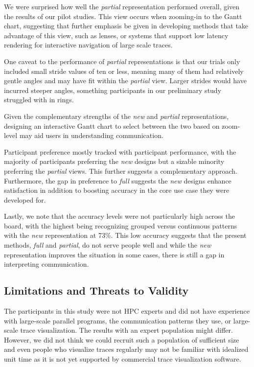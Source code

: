We were surprised how well the  {\em partial} representation performed overall, given the results of our pilot studies. This view occurs when zooming-in to the Gantt chart, suggesting that further emphasis be given in developing methods that take advantage of this view, such as lenses, or systems that support low latency rendering for interactive navigation of large scale traces.

One caveat to the performance of  {\em partial} representations is that our trials only included small stride values of ten or less, meaning many of them had relatively gentle angles and may have fit within the  {\em partial} view. Larger strides would have incurred steeper angles, something participants in our preliminary study struggled with in rings. 

Given the complementary strengths of the  {\em new} and  {\em partial} representations, designing an interactive Gantt chart to select between the two based on zoom-level may aid users in understanding communication.

Participant preference mostly tracked with participant performance, with the majority of participants preferring the {\em new} designs but a sizable minority preferring the {\em partial} views. This further suggests a complementary approach. Furthermore, the gap in preference to {\em full} suggests the {\em new} designs enhance satisfaction in addition to boosting accuracy in the core use case they were developed for.

Lastly, we note that the accuracy levels were not particularly high across the board, with the highest being recognizing grouped versus continuous patterns with the  {\em new} representation at 73\%. This low accuracy suggests that the present methods,  {\em full} and  {\em partial}, do not serve people well and while the  {\em new} representation improves the situation in some cases, there is still a gap in interpreting communication.
    
\subsection{Limitations and Threats to Validity}

The participants in this study were not HPC experts and did not have experience with large-scale parallel programs, the communication patterns they use, or large-scale trace visualization. The results with an expert population might differ. However, we did not think we could recruit such a population of sufficient size and even people who visualize traces regularly may not be familiar with idealized unit time as it is not yet supported by commercial trace visualization software.

